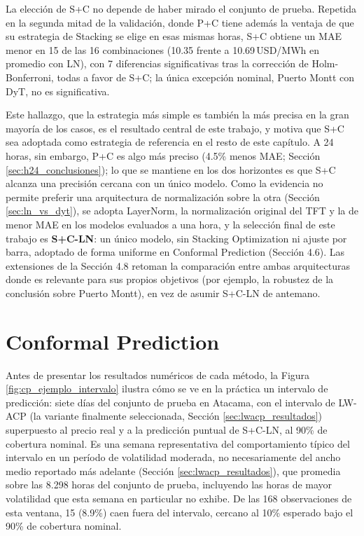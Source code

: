 La elección de S+C no depende de haber mirado el conjunto de prueba. Repetida en la segunda mitad de la validación, donde P+C tiene además la ventaja de que su estrategia de Stacking se elige en esas mismas horas, S+C obtiene un MAE menor en 15 de las 16 combinaciones (10.35 frente a 10.69\,USD/MWh en promedio con LN), con 7 diferencias significativas tras la corrección de Holm-Bonferroni, todas a favor de S+C; la única excepción nominal, Puerto Montt con DyT, no es significativa.

Este hallazgo, que la estrategia más simple es también la más precisa en la gran mayoría de los casos, es el resultado central de este trabajo, y motiva que S+C sea adoptada como estrategia de referencia en el resto de este capítulo. A 24 horas, sin embargo, P+C es algo más preciso (4.5\% menos MAE; Sección \ref{sec:h24_conclusiones}); lo que se mantiene en los dos horizontes es que S+C alcanza una precisión cercana con un único modelo. Como la evidencia no permite preferir una arquitectura de normalización sobre la otra (Sección \ref{sec:ln_vs_dyt}), se adopta LayerNorm, la normalización original del TFT y la de menor MAE en los modelos evaluados a una hora, y la selección final de este trabajo es \textbf{S+C-LN}: un único modelo, sin Stacking Optimization ni ajuste por barra, adoptado de forma uniforme en Conformal Prediction (Sección 4.6). Las extensiones de la Sección 4.8 retoman la comparación entre ambas arquitecturas donde es relevante para sus propios objetivos (por ejemplo, la robustez de la conclusión sobre Puerto Montt), en vez de asumir S+C-LN de antemano.

\section{Conformal Prediction}

Antes de presentar los resultados numéricos de cada método, la Figura \ref{fig:cp_ejemplo_intervalo} ilustra cómo se ve en la práctica un intervalo de predicción: siete días del conjunto de prueba en Atacama, con el intervalo de LW-ACP (la variante finalmente seleccionada, Sección \ref{sec:lwacp_resultados}) superpuesto al precio real y a la predicción puntual de S+C-LN, al 90\% de cobertura nominal. Es una semana representativa del comportamiento típico del intervalo en un período de volatilidad moderada, no necesariamente del ancho medio reportado más adelante (Sección \ref{sec:lwacp_resultados}), que promedia sobre las 8.298 horas del conjunto de prueba, incluyendo las horas de mayor volatilidad que esta semana en particular no exhibe. De las 168 observaciones de esta ventana, 15 (8.9\%) caen fuera del intervalo, cercano al 10\% esperado bajo el 90\% de cobertura nominal.

